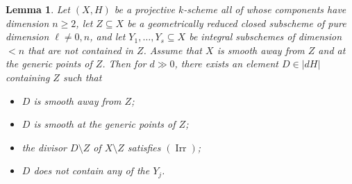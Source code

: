 \documentclass[11pt]{amsart}
\newtheorem{Lemma}[Thm]{Lemma}
\theoremstyle{definition}
\newcommand{\Irr}{\operatorname{Irr}}
\begin{document}

\begin{Lemma}\label{Lem Bertini containing subvariety}
Let $(X,H)$ be a projective $k$-scheme all of whose components have
dimension $n \geq 2$, let $Z \subseteq X$ be a geometrically reduced
closed subscheme of pure dimension $\ell \neq 0,n$, and let $Y_1,
\ldots, Y_s \subseteq X$ be integral subschemes of dimension $< n$
that are not contained in $Z$. Assume that $X$ is smooth away from
$Z$ and at the generic points of $Z$. Then for $d \gg 0$, there
exists an element $D \in |dH|$ containing $Z$ such that
\begin{itemize}
\item $D$ is smooth away from $Z$;
\item $D$ is smooth at the generic points of $Z$;
\item the divisor $D \setminus Z$ of $X \setminus Z$ satisfies $(\Irr)$;
\item $D$ does not contain any of the $Y_j$.
\end{itemize}
\end{Lemma}
\end{document}
